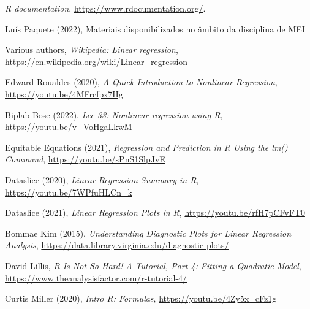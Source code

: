 \documentclass{uofa-eng-assignment}
\begin{document}
\begin{thebibliography}{ht}
\emph{R documentation}, \url{https://www.rdocumentation.org/}.

Luís Paquete (2022), Materiais disponibilizados no âmbito da disciplina de MEI

Various authors, \emph{Wikipedia: Linear regression}, \url{https://en.wikipedia.org/wiki/Linear\_regression}

Edward Roualdes (2020), \emph{A Quick Introduction to Nonlinear Regression}, \url{https://youtu.be/4MFrcfpx7Hg}

Biplab Bose (2022), \emph{Lec 33: Nonlinear regression using R}, \url{https://youtu.be/v\_VoHgaLkwM}

Equitable Equations (2021), \emph{Regression and Prediction in R Using the lm() Command}, \url{https://youtu.be/sPnS1SlpJvE}

Dataslice (2020), \emph{Linear Regression Summary in R}, \url{https://youtu.be/7WPfuHLCn\_k}

Dataslice (2021), \emph{Linear Regression Plots in R}, \url{https://youtu.be/rfH7pCFvFT0}

Bommae Kim (2015), \emph{Understanding Diagnostic Plots for Linear Regression Analysis}, \url{https://data.library.virginia.edu/diagnostic-plots/}

David Lillis, \emph{R Is Not So Hard! A Tutorial, Part 4: Fitting a Quadratic Model}, \url{https://www.theanalysisfactor.com/r-tutorial-4/}

Curtis Miller (2020), \emph{Intro R: Formulas}, \url{https://youtu.be/4Zy5x\_cFz1g}

\end{thebibliography}
\end{document}
